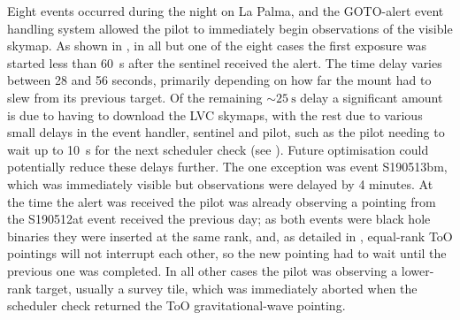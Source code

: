 \begin{colsection}
\begin{colsection}
Eight events occurred during the night on La Palma, and the GOTO-alert event handling system allowed the pilot to immediately begin observations of the visible skymap. As shown in , in all but one of the eight cases the first exposure was started less than \SI{60}{\second} after the sentinel received the alert. The time delay varies between 28 and 56 seconds, primarily depending on how far the mount had to slew from its previous target. Of the remaining $\sim\SI{25}{\second}$ delay a significant amount is due to having to download the LVC skymaps, with the rest due to various small delays in the event handler, sentinel and pilot, such as the pilot needing to wait up to \SI{10}{\second} for the next scheduler check (see ). Future optimisation could potentially reduce these delays further. The one exception was event S190513bm, which was immediately visible but observations were delayed by 4 minutes. At the time the alert was received the pilot was already observing a pointing from the S190512at event received the previous day; as both events were black hole binaries they were inserted at the same rank, and, as detailed in , equal-rank ToO pointings will not interrupt each other, so the new pointing had to wait until the previous one was completed. In all other cases the pilot was observing a lower-rank target, usually a survey tile, which was immediately aborted when the scheduler check returned the ToO gravitational-wave pointing.


\end{colsection}
\end{colsection}
